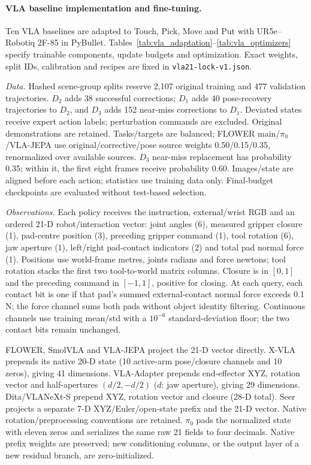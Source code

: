 \paragraph{VLA baseline implementation and fine-tuning.}
\label{par:vla_reproducibility}
Ten VLA baselines are adapted to Touch, Pick, Move and Put with UR5e--Robotiq
2F-85 in PyBullet. Tables~\ref{tab:vla_adaptation}--\ref{tab:vla_optimizers} specify
trainable components, update budgets and optimization.
Exact weights, split IDs, calibration and recipes are fixed in
\texttt{vla21-lock-v1.json}.

\noindent\textit{Data.}
Hashed scene-group splits reserve 2,107 original training and 477 validation
trajectories. $D_2$ adds 38 successful corrections; $D_1$ adds 40 pose-recovery
trajectories to $D_2$, and $D_3$ adds 152 near-miss corrections to $D_1$.
Deviated states receive expert action labels; perturbation commands are excluded.
Original demonstrations are retained. Tasks/targets are
balanced; FLOWER main/$\pi_0$/VLA-JEPA use original/corrective/pose source weights
0.50/0.15/0.35, renormalized over available sources. $D_3$ near-miss replacement
has probability 0.35; within it, the first eight frames receive probability 0.60.
Images/state are aligned before each action; statistics use training data only.
Final-budget checkpoints
are evaluated without test-based selection.



\noindent\textit{Observations.}
Each policy receives the instruction, external/wrist RGB and an ordered 21-D
robot/interaction vector: joint angles (6), measured gripper closure (1),
pad-centre position (3), preceding gripper command (1), tool rotation (6), jaw
aperture (1), left/right pad-contact indicators (2) and total pad normal force (1).
Positions use world-frame metres, joints radians and force newtons; tool rotation
stacks the first two tool-to-world matrix columns. Closure is
in $[0,1]$ and the preceding command in $[-1,1]$, positive for closing.
At each query, each contact bit is one if that pad's summed external-contact
normal force exceeds 0.1\,N; the force channel sums both pads without object
identity filtering. Continuous channels use training mean/std with a
$10^{-6}$ standard-deviation floor; the two contact bits remain unchanged.

FLOWER, SmolVLA and VLA-JEPA project the 21-D vector directly. X-VLA prepends
its native 20-D state (10 active-arm pose/closure channels and 10 zeros), giving
41 dimensions. VLA-Adapter prepends end-effector XYZ, rotation vector and
half-apertures $(d/2,-d/2)$ ($d$: jaw aperture), giving 29 dimensions.
Dita/VLANeXt-S prepend XYZ, rotation vector and closure (28-D total).
Seer projects a separate 7-D XYZ/Euler/open-state
prefix and the 21-D vector. Native rotation/preprocessing conventions are
retained. $\pi_0$ pads the normalized state with eleven zeros and serializes
the same raw 21 fields to four decimals. Native prefix weights are preserved;
new conditioning columns, or the output layer of a new residual branch,
are zero-initialized.


